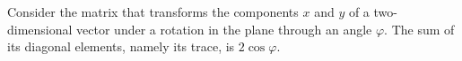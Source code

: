 Consider the matrix that transforms the components $x$ and $y$ of a two-dimensional vector under a rotation in the plane through an angle $\varphi$.
The sum of its diagonal elements, namely its trace, is $2\cos\varphi$.
